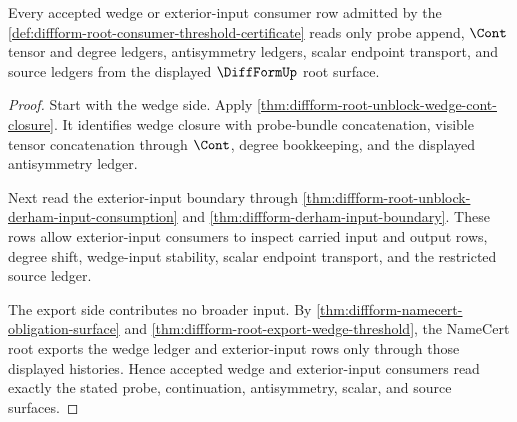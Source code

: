 \begin{theorem}
\label{thm:diffform-root-consumer-wedge-input-readback}
Every accepted wedge or exterior-input consumer row admitted by the
\autoref{def:diffform-root-consumer-threshold-certificate} reads only probe
append, $\Cont$ tensor and degree ledgers, antisymmetry ledgers, scalar
endpoint transport, and source ledgers from the displayed
$\DiffFormUp$ root surface.
\end{theorem}
\begin{proof}
Start with the wedge side. Apply
\autoref{thm:diffform-root-unblock-wedge-cont-closure}. It identifies wedge
closure with probe-bundle concatenation, visible tensor concatenation through
$\Cont$, degree bookkeeping, and the displayed antisymmetry ledger.

Next read the exterior-input boundary through
\autoref{thm:diffform-root-unblock-derham-input-consumption} and
\autoref{thm:diffform-derham-input-boundary}. These rows allow
exterior-input consumers to inspect carried input and output rows, degree
shift, wedge-input stability, scalar endpoint transport, and the restricted
source ledger.

The export side contributes no broader input. By
\autoref{thm:diffform-namecert-obligation-surface} and
\autoref{thm:diffform-root-export-wedge-threshold}, the NameCert root exports
the wedge ledger and exterior-input rows only through those displayed
histories. Hence accepted wedge and exterior-input consumers read exactly the
stated probe, continuation, antisymmetry, scalar, and source surfaces.
\end{proof}

